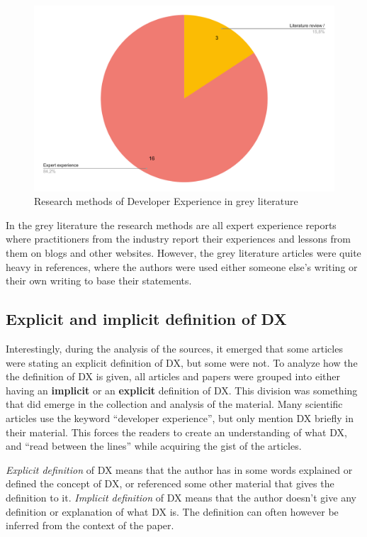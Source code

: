 \documentclass[english, 12pt, a4paper, sci, utf8, a-1b, online]{aaltothesis}
\begin{document}
\begin{figure}[ht]
  \captionsetup{width=0.6\textwidth}
  \begin{center}
    \caption{Research methods of Developer Experience in grey literature}
    \includegraphics[width=\textwidth]{research-methods-grey.pdf}
  \end{center}
\end{figure}

In the grey literature the research methods are all expert experience reports where practitioners from the industry report their experiences and lessons from them on blogs and other websites. However, the grey literature articles were quite heavy in references, where the authors were used either someone else's writing or their own writing to base their statements.

\subsection{Explicit and implicit definition of DX}

Interestingly, during the analysis of the sources, it emerged that some articles were stating an explicit definition of DX, but some were not. To analyze how the the definition of DX is given, all articles and papers were grouped into either having an \textbf{implicit} or an \textbf{explicit} definition of DX. This division was something that did emerge in the collection and analysis of the material. Many scientific articles use the keyword ``developer experience'', but only mention DX briefly in their material. This forces the readers to create an understanding of what DX, and ``read between the lines'' while acquiring the gist of the articles.

\textit{Explicit definition} of DX means that the author has in some words explained or defined the concept of DX, or referenced some other material that gives the definition to it. \textit{Implicit definition} of DX means that the author doesn't give any definition or explanation of what DX is. The definition can often however be inferred from the context of the paper.
\end{document}
